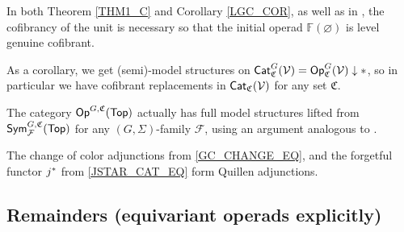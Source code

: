 \documentclass[a4paper,10pt
,draft
]{article}%
\renewcommand{\F}{\mathcal F}
\renewcommand{\1}{\eta}%
\begin{document}
\begin{remark}
In both Theorem \ref{THM1_C} and Corollary \ref{LGC_COR}, as well as in \cite{BP_geo},
the cofibrancy of the unit is necessary so that the initial operad $\mathbb F(\varnothing)$ is level genuine cofibrant.
\end{remark}




\begin{remark}
      \label{CATV_MC_REM}
      As a corollary, we get (semi)-model structures on $\Cat^{G}_{ \mathfrak C}(\V) = \Op^{G}_{\mathfrak C}(\V) \downarrow \**$,
      so in particular we have cofibrant replacements in $\mathsf{Cat}_{\mathfrak C}(\mathcal V)$ for any set $\mathfrak C$.
\end{remark}


\begin{remark}
      \label{TOP_FULL_REM}
      The category $\mathsf{Op}^{G,\mathfrak C}(\mathsf{Top})$ actually has full model structures lifted from $\Sym^{G, \mathfrak C}_\F(\Top)$
      for any $(G, \Sigma)$-family $\F$,
      using an argument analogous to \cite[Thm. 3.1]{GW18}.
\end{remark}




\begin{corollary}\label{COLOR_CHANGE_Q_COR}
      The change of color adjunctions from \eqref{GC_CHANGE_EQ},
      and the forgetful functor $j^{\**}$ from \eqref{JSTAR_CAT_EQ}
      form Quillen adjunctions.
\end{corollary}













\subsection{Remainders (equivariant operads explicitly)}
\end{document}
